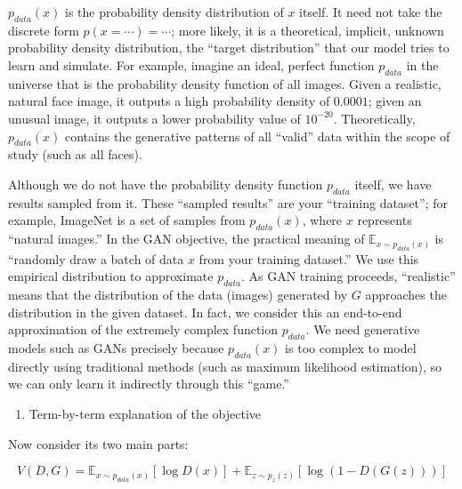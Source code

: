 \(p_{data}(x)\) is the probability density distribution of \(x\) itself. It need not take the discrete form \(p(x=\cdots)=\cdots\); more likely, it is a theoretical, implicit, unknown probability density distribution, the ``target distribution'' that our model tries to learn and simulate. For example, imagine an ideal, perfect function \(p_{data}\) in the universe that is the probability density function of all images. Given a realistic, natural face image, it outputs a high probability density of \(0.0001\); given an unusual image, it outputs a lower probability value of \(10^{-20}\). Theoretically, \(p_{data}(x)\) contains the generative patterns of all ``valid'' data within the scope of study (such as all faces).

Although we do not have the probability density function \(p_{data}\) itself, we have results sampled from it. These ``sampled results'' are your ``training dataset''; for example, ImageNet is a set of samples from \(p_{data}(x)\), where \(x\) represents ``natural images.'' In the GAN objective, the practical meaning of \(\mathbb{E}_{x\sim p_{data}(x)}\) is ``randomly draw a batch of data \(x\) from your training dataset.'' We use this empirical distribution to approximate \(p_{data}\). As GAN training proceeds, ``realistic'' means that the distribution of the data (images) generated by \(G\) approaches the distribution in the given dataset. In fact, we consider this an end-to-end approximation of the extremely complex function \(p_{data}\). We need generative models such as GANs precisely because \(p_{data}(x)\) is too complex to model directly using traditional methods (such as maximum likelihood estimation), so we can only learn it indirectly through this ``game.''

\begin{enumerate}
\def\labelenumi{\arabic{enumi}.}
\setcounter{enumi}{2}
\tightlist
\item
  Term-by-term explanation of the objective
\end{enumerate}

Now consider its two main parts:

\[
V(D,G)=\mathbb{E}_{x\sim p_{data}(x)}[\log D(x)] + \mathbb{E}_{z\sim p_z(z)}[\log(1-D(G(z)))]
\]

